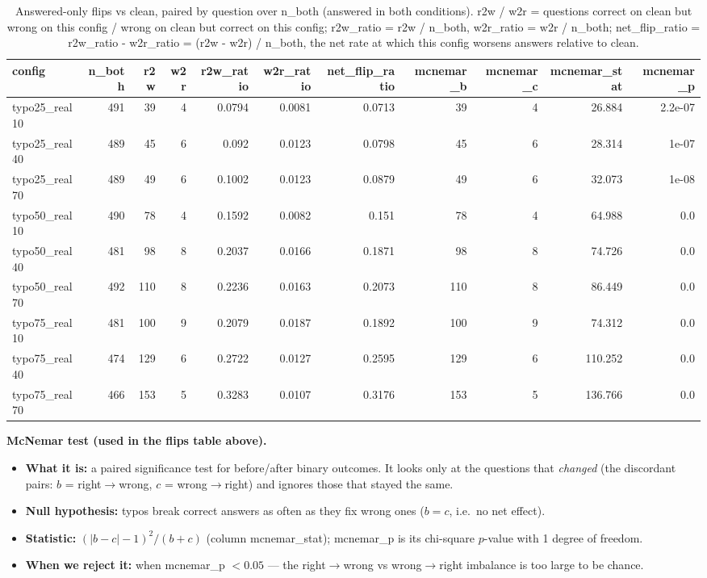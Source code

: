 \documentclass[11pt]{article}
\begin{document}
\begin{table}[H]
\centering
\caption{Answered-only flips vs clean, paired by question over n\_both (answered in both conditions). r2w / w2r = questions correct on clean but wrong on this config / wrong on clean but correct on this config; r2w\_ratio = r2w / n\_both, w2r\_ratio = w2r / n\_both; net\_flip\_ratio = r2w\_ratio - w2r\_ratio = (r2w - w2r) / n\_both, the net rate at which this config worsens answers relative to clean.}
\small
\begin{adjustbox}{max width=\textwidth}
\begin{tabular}{lrrrrrrrrrr}
\toprule
\textbf{config} & \textbf{n\_both} & \textbf{r2w} & \textbf{w2r} & \textbf{r2w\_ratio} & \textbf{w2r\_ratio} & \textbf{net\_flip\_ratio} & \textbf{mcnemar\_b} & \textbf{mcnemar\_c} & \textbf{mcnemar\_stat} & \textbf{mcnemar\_p} \\
\midrule
typo25\_real10 & 491 & 39 & 4 & 0.0794 & 0.0081 & 0.0713 & 39 & 4 & 26.884 & 2.2e-07 \\
typo25\_real40 & 489 & 45 & 6 & 0.092 & 0.0123 & 0.0798 & 45 & 6 & 28.314 & 1e-07 \\
typo25\_real70 & 489 & 49 & 6 & 0.1002 & 0.0123 & 0.0879 & 49 & 6 & 32.073 & 1e-08 \\
typo50\_real10 & 490 & 78 & 4 & 0.1592 & 0.0082 & 0.151 & 78 & 4 & 64.988 & 0.0 \\
typo50\_real40 & 481 & 98 & 8 & 0.2037 & 0.0166 & 0.1871 & 98 & 8 & 74.726 & 0.0 \\
typo50\_real70 & 492 & 110 & 8 & 0.2236 & 0.0163 & 0.2073 & 110 & 8 & 86.449 & 0.0 \\
typo75\_real10 & 481 & 100 & 9 & 0.2079 & 0.0187 & 0.1892 & 100 & 9 & 74.312 & 0.0 \\
typo75\_real40 & 474 & 129 & 6 & 0.2722 & 0.0127 & 0.2595 & 129 & 6 & 110.252 & 0.0 \\
typo75\_real70 & 466 & 153 & 5 & 0.3283 & 0.0107 & 0.3176 & 153 & 5 & 136.766 & 0.0 \\
\bottomrule
\end{tabular}
\end{adjustbox}
\end{table}

\medskip
\noindent\textbf{McNemar test (used in the flips table above).}
\begin{itemize}\setlength{\itemsep}{1pt}
  \item \textbf{What it is:} a paired significance test for before/after binary
  outcomes. It looks only at the questions that \emph{changed} (the discordant pairs:
  $b$ = right$\to$wrong, $c$ = wrong$\to$right) and ignores those that stayed the same.
  \item \textbf{Null hypothesis:} typos break correct answers as often as they fix
  wrong ones ($b = c$, i.e.\ no net effect).
  \item \textbf{Statistic:} $(|b - c| - 1)^2 / (b + c)$ (column mcnemar\_stat);
  mcnemar\_p is its chi-square $p$-value with 1 degree of freedom.
  \item \textbf{When we reject it:} when mcnemar\_p $< 0.05$ --- the
  right$\to$wrong vs wrong$\to$right imbalance is too large to be chance.
\end{itemize}
\end{document}
